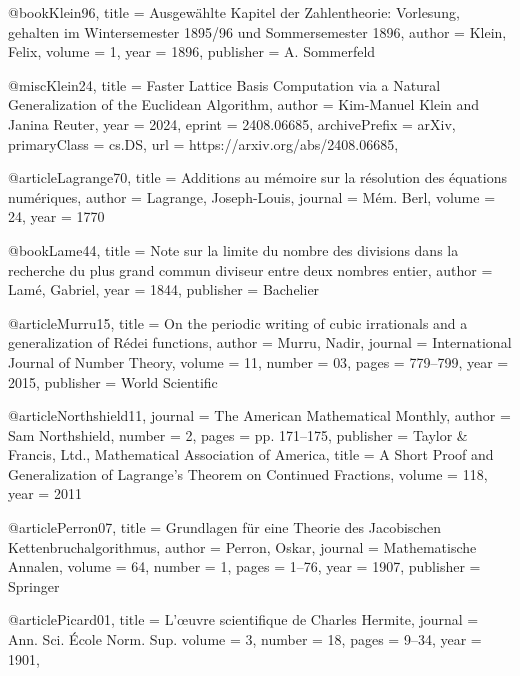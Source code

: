 \documentclass[english,version-2020-11]{uzl-thesis}
\begin{document}
\begin{bibtex-entries}
@book{Klein96,
  title     = {Ausgew{\"a}hlte Kapitel der Zahlentheorie: Vorlesung, gehalten im Wintersemester 1895/96 und Sommersemester 1896},
  author    = {Klein, Felix},
  volume    = {1},
  year      = {1896},
  publisher = {A. Sommerfeld}
}

@misc{Klein24,
  title         = {Faster Lattice Basis Computation via a Natural Generalization of the Euclidean Algorithm},
  author        = {Kim-Manuel Klein and Janina Reuter},
  year          = {2024},
  eprint        = {2408.06685},
  archivePrefix = {arXiv},
  primaryClass  = {cs.DS},
  url           = {https://arxiv.org/abs/2408.06685},
}

@article{Lagrange70,
  title   = {Additions au m{\'e}moire sur la r{\'e}solution des {\'e}quations num{\'e}riques},
  author  = {Lagrange, Joseph-Louis},
  journal = {M{\'e}m. Berl},
  volume  = {24},
  year    = {1770}
}

@book{Lame44,
  title     = {Note sur la limite du nombre des divisions dans la recherche du plus grand commun diviseur entre deux nombres entier},
  author    = {Lam{\'e}, Gabriel},
  year      = {1844},
  publisher = {Bachelier}
}

@article{Murru15,
  title     = {On the periodic writing of cubic irrationals and a generalization of R{\'e}dei functions},
  author    = {Murru, Nadir},
  journal   = {International Journal of Number Theory},
  volume    = {11},
  number    = {03},
  pages     = {779--799},
  year      = {2015},
  publisher = {World Scientific}
}

@article{Northshield11,
	journal   = {The American Mathematical Monthly},
	author    = {Sam Northshield},
	number    = {2},
	pages     = {pp. 171--175},
	publisher = {Taylor & Francis, Ltd., Mathematical Association of America},
	title     = {A Short Proof and Generalization of Lagrange’s Theorem on Continued Fractions},
	volume    = {118},
	year      = {2011}
}

@article{Perron07,
  title     = {Grundlagen f{\"u}r eine Theorie des Jacobischen Kettenbruchalgorithmus},
  author    = {Perron, Oskar},
  journal   = {Mathematische Annalen},
  volume    = {64},
  number    = {1},
  pages     = {1--76},
  year      = {1907},
  publisher = {Springer}
}

@article{Picard01,
  title   = {L'{\oe}uvre scientifique de Charles Hermite},
  journal = {Ann. Sci. {\'E}cole Norm. Sup.}
  volume  = {3},
  number  = {18},
  pages   = {9--34},
  year    = {1901},
}
\end{bibtex-entries}
\end{document}
